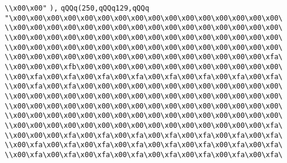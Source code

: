\verb|\\x00\x00"|\newline
\verb|),|\newline
\verb|qQQq(250,qQQq129,qQQq|\newline
\verb|"\x00\x00\x00\x00\x00\x00\x00\x00\x00\x00\x00\x00\x00\x00\x00\x00\|\newline
\verb|\\x00\x00\x00\x00\x00\x00\x00\x00\x00\x00\x00\x00\x00\x00\x00\x00\|\newline
\verb|\\x00\x00\x00\x00\x00\x00\x00\x00\x00\x00\x00\x00\x00\x00\x00\x00\|\newline
\verb|\\x00\x00\x00\x00\x00\x00\x00\x00\x00\x00\x00\x00\x00\x00\x00\x00\|\newline
\verb|\\x00\x00\x00\x00\x00\x00\x00\x00\x00\x00\x00\x00\x00\x00\x00\xfa\|\newline
\verb|\\x00\x00\x00\xfb\x00\x00\x00\x00\x00\x00\x00\x00\x00\x00\x00\x00\|\newline
\verb|\\x00\xfa\x00\xfa\x00\xfa\x00\xfa\x00\xfa\x00\xfa\x00\xfa\x00\xfa\|\newline
\verb|\\x00\xfa\x00\xfa\x00\x00\x00\x00\x00\x00\x00\x00\x00\x00\x00\x00\|\newline
\verb|\\x00\x00\x00\x00\x00\x00\x00\x00\x00\x00\x00\x00\x00\x00\x00\x00\|\newline
\verb|\\x00\x00\x00\x00\x00\x00\x00\x00\x00\x00\x00\x00\x00\x00\x00\x00\|\newline
\verb|\\x00\x00\x00\x00\x00\x00\x00\x00\x00\x00\x00\x00\x00\x00\x00\x00\|\newline
\verb|\\x00\x00\x00\x00\x00\x00\x00\x00\x00\x00\x00\x00\x00\x00\x00\xfa\|\newline
\verb|\\x00\x00\x00\xfa\x00\xfa\x00\xfa\x00\xfa\x00\xfa\x00\xfa\x00\xfa\|\newline
\verb|\\x00\xfa\x00\xfa\x00\xfa\x00\xfa\x00\xfa\x00\xfa\x00\xfa\x00\xfa\|\newline
\verb|\\x00\xfa\x00\xfa\x00\xfa\x00\xfa\x00\xfa\x00\xfa\x00\xfa\x00\xfa\|\newline
